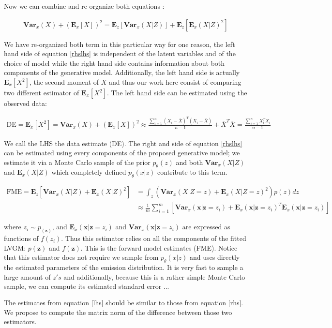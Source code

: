 \documentclass{article}
\newcommand{\Vx}{\textbf{Var}_x}
\newcommand{\Ex}{\textbf{E}_x}
\newcommand{\Ez}{\textbf{E}_z}
\newcommand{\x}{\mathbf{x}}
\newcommand{\z}{\mathbf{z}}
\begin{document}
{Now we can combine and re-organize both equations :

\begin{align}
\Vx(X)+ (\Ex[X])^2 = \Ez[\Vx(X|Z)] + \Ez[\Ex(X|Z)^2]
\label{rhslhs}
\end{align}

We have re-organized both term in this particular way for one reason, the left hand side of equation \ref{rhslhs} is independent of the latent variables and of the choice of model while the right hand side contains information about both components of the generative model. Additionally, the left hand side is actually $\Ex[X^2]$, the second moment of $X$ and thus our work here consist of comparing two different estimator of $\Ex[X^2]$. The left hand side can be estimated using the observed data:  

\begin{align}
\text{DE} = \Ex[X^2] = \Vx(X)+ (\Ex[X])^2 \approx \frac{\sum_{i=1}^n(X_i-\bar{X})^T(X_i-\bar{X})}{n-1} + \bar{X}^T\bar{X} = \frac{\sum_{i=1}^n X_i^TX_i}{n-1}
\label{lhs}
\end{align}

We call the LHS the data estimate (DE). The right and side of equation \ref{rhslhs} can be estimated using every components of the proposed generative model; we estimate it via a Monte Carlo sample of the prior $p_\theta(z)$ and both $\Vx(X|Z)$ and $\Ex(X|Z)$ which completely defined $p_\theta(x|z)$ contribute to this term. 

\begin{align}
\text{FME}= \Ez[\Vx(X|Z) + \Ex(X|Z)^2] &= \int_z (\Vx(X|Z=z)+\Ex(X|Z=z)^2)p(z) dz \\ 
&\approx \frac{1}{m} \sum_{i=1}^m \left[\Vx(\x|\z=z_i) + \Ex(\x|\z=z_i)^T\Ex(\x|\z=z_i)\right]
\label{rhs}
\end{align}

where $z_i \sim p_(\z)$, and $\Ex(\x|\z=z_i)$ and  $\Vx(\x|\z=z_i)$ are expressed as functions of $f(z_i)$. Thus this estimator relies on all the components of the fitted LVGM: $p(\z)$ and $f(\z)$. This is the forward model estimates (FME). Notice that this estimator does not require we sample from $p_\theta(x|z)$ and uses directly the estimated parameters of the emission distribution. It is very fast to sample a large amount of $z's$ and additionally, because this is a rather simple Monte Carlo sample, we can compute its estimated standard error ...

\bigskip

The estimates from equation \ref{lhs} should be similar to those from equation \ref{rhs}. We propose to compute the matrix norm of the difference between those two estimators.

}
\end{document}
